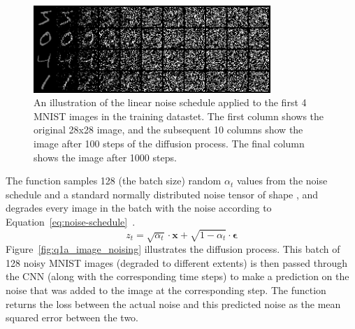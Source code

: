 \begin{figure}[t]
    \centering
    \includegraphics[width=0.8\textwidth]{figures/q1a_image_noising}
    \caption{An illustration of the linear noise schedule applied to the first 4 MNIST images in the training datastet.
        The first column shows the original 28x28 image, and the subsequent 10 columns show the image after 100 steps
        of the diffusion process.
        The final column shows the image after 1000 steps.}
    \label{fig:q1a_image_noising}
\end{figure}

The  function samples 128 (the batch size) random $\alpha_{t}$ values from the noise schedule and
a standard normally distributed noise tensor of shape , and degrades every image in the batch
with the noise according to Equation~\eqref{eq:noise-schedule}~\cite{prince}.
\begin{equation}\label{eq:noise-schedule}
    z_{t} = \sqrt{\alpha_{t}} \cdot \mathbf{x} + \sqrt{1 - \alpha_{t}} \cdot \mathbf{\epsilon}
\end{equation}
Figure~\eqref{fig:q1a_image_noising} illustrates the diffusion process.
This batch of 128 noisy MNIST images (degraded to different extents) is then passed through the CNN (along with the
corresponding time steps) to make a prediction on the noise that was added to the image at the corresponding step.
The function returns the loss between the actual noise and this predicted noise as the mean squared error between the
two.

